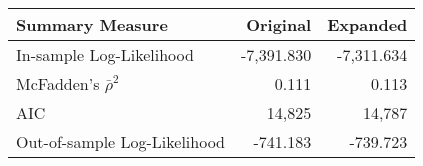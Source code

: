 \begin{tabular}{lrr}
\toprule
{Summary Measure}                   &           Original    &    Expanded \\
\midrule
In-sample Log-Likelihood            &      -7,391.830    &    -7,311.634 \\
McFadden's $\bar{\rho}^2$         &               0.111    &            0.113 \\
AIC 										   &            14,825     &          14,787 \\
Out-of-sample Log-Likelihood     &         -741.183 &           -739.723 \\

\bottomrule
\end{tabular}